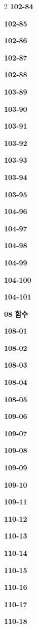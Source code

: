 \documentclass[10pt,a4paper]{article}
\begin{document}
\begin{multicols}{2}
\noindent\textbf{102-84}\ \par
\noindent\textbf{102-85}\ \par
\noindent\textbf{102-86}\ \par
\noindent\textbf{102-87}\ \par
\noindent\textbf{102-88}\ \par
\noindent\textbf{103-89}\ \par
\noindent\textbf{103-90}\ \par
\noindent\textbf{103-91}\ \par
\noindent\textbf{103-92}\ \par
\noindent\textbf{103-93}\ \par
\noindent\textbf{103-94}\ \par
\noindent\textbf{103-95}\ \par
\noindent\textbf{104-96}\ \par
\noindent\textbf{104-97}\ \par
\noindent\textbf{104-98}\ \par
\noindent\textbf{104-99}\ \par
\noindent\textbf{104-100}\ \par
\noindent\textbf{104-101}\ \par
\noindent\textbf{08 함수}\par\smallskip
\noindent\textbf{108-01}\ \par
\noindent\textbf{108-02}\ \par
\noindent\textbf{108-03}\ \par
\noindent\textbf{108-04}\ \par
\noindent\textbf{108-05}\ \par
\noindent\textbf{109-06}\ \par
\noindent\textbf{109-07}\ \par
\noindent\textbf{109-08}\ \par
\noindent\textbf{109-09}\ \par
\noindent\textbf{109-10}\ \par
\noindent\textbf{109-11}\ \par
\noindent\textbf{110-12}\ \par
\noindent\textbf{110-13}\ \par
\noindent\textbf{110-14}\ \par
\noindent\textbf{110-15}\ \par
\noindent\textbf{110-16}\ \par
\noindent\textbf{110-17}\ \par
\noindent\textbf{110-18}\ \par

\end{multicols}
\end{document}
